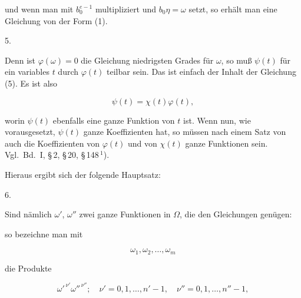 und wenn man mit $b_0^{e-1}$ multipliziert und $b_0\eta = \omega$ setzt, so erh\"alt man
eine Gleichung von der Form (1).

5.\ 



Denn ist $\varphi(\omega) = 0$ die Gleichung niedrigsten Grades f\"ur $\omega$, so mu\ss{}
$\psi(t)$ f\"ur ein variables $t$ durch $\varphi(t)$ teilbar sein. Das ist einfach der
Inhalt der Gleichung (5). Es ist also

\[
\psi(t) = \chi(t)\varphi(t),
\]

worin $\psi(t)$ ebenfalls eine ganze Funktion von $t$ ist.
Wenn nun, wie vorausgesetzt,
$\psi(t)$ ganze Koeffizienten hat, so m\"ussen nach einem Satz von  auch
die Koeffizienten von $\varphi(t)$ und von $\chi(t)$ ganze Funktionen sein. Vgl.\ Bd.\ I,
\S\,2, \S\,20, \S\,148\,$^1$).

Hieraus ergibt sich der folgende Hauptsatz:

6.\ 

Sind n\"amlich $\omega'$, $\omega''$ zwei ganze Funktionen in $\Omega$, die den
Gleichungen gen\"ugen:


so bezeichne man mit

\[
\omega_1, \omega_2, \ldots, \omega_m
\]

die Produkte

\[
\omega'^{\,\nu'}\omega''^{\,\nu''}; \quad \nu' = 0, 1, \ldots, n'-1, \quad
\nu'' = 0, 1, \ldots, n''-1,
\]

